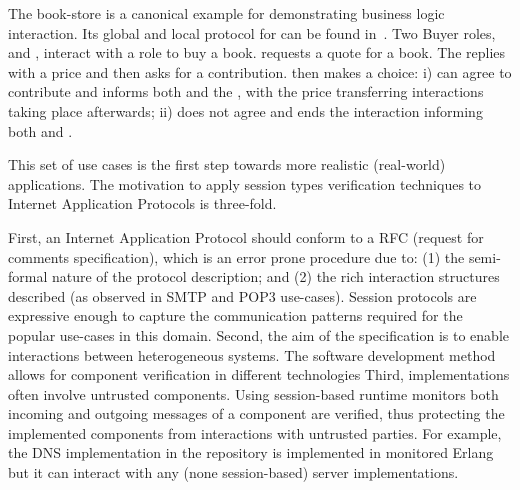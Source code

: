The book-store is a canonical example for demonstrating 
business logic interaction.
Its global and  local protocol for \BuyerOne
can be found in~. Two
Buyer roles, \BuyerOne and \BuyerTwo, interact with a \Seller
role to buy a book. \BuyerOne requests a quote for a book.
The \Seller replies with a price and then \BuyerOne asks
\BuyerTwo for a contribution. \BuyerTwo then makes a choice:
i) \BuyerTwo can agree to contribute and informs both \BuyerOne
and the \Seller, with the price transferring interactions taking
place afterwards; ii) \BuyerTwo does not agree and ends the interaction
informing both \BuyerOne and \Seller.
%




This set of use cases is the first step towards
more realistic (real-world) applications.
The motivation to apply session types verification
techniques to Internet Application Protocols is three-fold.

First, an Internet Application Protocol should conform to
a RFC (request for comments specification), which is an error prone
procedure due to:
(1) the semi-formal nature of the protocol description; and
(2) the rich interaction structures described
(as observed in SMTP and POP3 use-cases).
Session protocols %
are expressive enough to capture the communication
patterns required for the popular use-cases in this domain.  
Second, the aim of the specification is to enable
interactions between heterogeneous systems.
The software development method allows for component
verification in different technologies
Third, implementations often involve untrusted components.
Using session-based runtime monitors both incoming and outgoing
messages of a component are verified, thus protecting the
implemented components from interactions with untrusted parties.
For example, the DNS implementation in the repository
is implemented in monitored Erlang but it can interact with any
(none session-based) server implementations.

